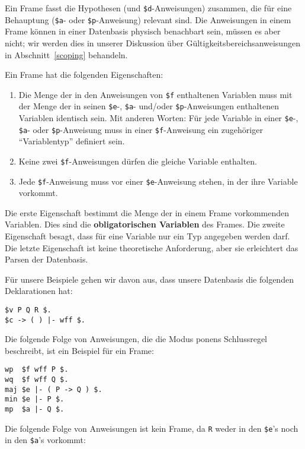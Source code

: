 Ein Frame fasst die Hypothesen (und \texttt{\$d}-Anweisungen) zusammen, die für eine Behauptung (\texttt{\$a}- oder \texttt{\$p}-Anweisung) relevant sind.  Die Anweisungen in einem Frame können in einer Datenbasis physisch benachbart sein, müssen es aber nicht; wir werden dies in unserer Diskussion über Gültigkeitsbereichsanweisungen in Abschnitt~\ref{scoping} behandeln.

Ein Frame hat die folgenden Eigenschaften:
\begin{enumerate}
 \item Die Menge der in den Anweisungen von \texttt{\$f} enthaltenen Variablen muss mit der Menge der in seinen \texttt{\$e}-, \texttt{\$a}- und/oder \texttt{\$p}-Anweisungen enthaltenen Variablen identisch sein.  Mit anderen Worten: Für jede Variable in einer \texttt{\$e}-, \texttt{\$a}- oder \texttt{\$p}-Anweisung muss in einer \texttt{\$f}-Anweisung ein zugehöriger "`Variablentyp"' definiert sein.
  \item Keine zwei \texttt{\$f}-Anweisungen dürfen die gleiche Variable enthalten.
  \item Jede \texttt{\$f}-Anweisung muss vor einer \texttt{\$e}-Anweisung stehen, in der ihre Variable vorkommt.
\end{enumerate}

Die erste Eigenschaft bestimmt die Menge der in einem Frame vorkommenden Variablen. Dies sind die {\bf obligatorischen Variablen} des Frames.  Die zweite Eigenschaft besagt, dass für eine Variable nur ein Typ angegeben werden darf. Die letzte Eigenschaft ist keine theoretische Anforderung, aber sie erleichtert das Parsen der Datenbasis.

Für unsere Beispiele gehen wir davon aus, dass unsere Datenbasis die folgenden Deklarationen hat:

\begin{verbatim}
$v P Q R $.
$c -> ( ) |- wff $.
\end{verbatim}

Die folgende Folge von Anweisungen, die die Modus ponens Schlussregel beschreibt, ist ein Beispiel für ein Frame:

\begin{verbatim}
wp  $f wff P $.
wq  $f wff Q $.
maj $e |- ( P -> Q ) $.
min $e |- P $.
mp  $a |- Q $.
\end{verbatim}

Die folgende Folge von Anweisungen ist kein Frame, da \texttt{R} weder in den \texttt{\$e}'s noch in den \texttt{\$a}'s vorkommt:


